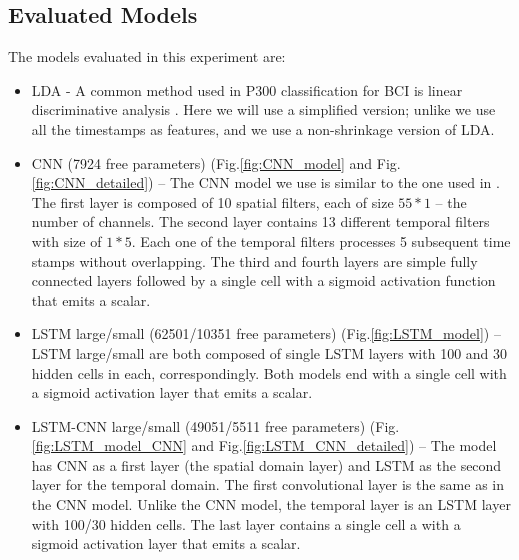 \documentclass[
12pt, %
english, %
doublespacing, %
headsepline, %
]{MastersDoctoralThesis} %
\begin{document}
\subsection{Evaluated Models}
The models evaluated in this experiment are:
\begin{itemize}
	\item LDA - A common method used in P300 classification for BCI is linear discriminative analysis \cite{BlaknertzExperiment,P300_Tutorial}. Here we will use a simplified version; unlike \cite{BlaknertzExperiment} we use all the timestamps as features, and we use a non-shrinkage version of LDA.
	
	\item CNN (7924 free parameters) (Fig.\ref{fig:CNN_model} and Fig.\ref{fig:CNN_detailed}) -- The CNN model we use is similar to the one used in \cite{P300_CNN}. The first layer is composed of 10  spatial filters, each of size $55*1$ -- the number of channels. The second layer contains 13 different temporal filters with size of $1*5$. Each one of the temporal filters processes 5 subsequent time stamps without overlapping. The third and fourth layers are simple fully connected layers followed by a single cell with a sigmoid activation function that emits a scalar.
	
	\item LSTM large/small (62501/10351 free parameters) (Fig.\ref{fig:LSTM_model}) -- LSTM large/small are both composed of single LSTM layers with 100 and 30 hidden cells in each, correspondingly. Both models end with a single cell with a sigmoid activation layer that emits a scalar.
	
	\item LSTM-CNN large/small (49051/5511 free parameters) (Fig.\ref{fig:LSTM_model_CNN} and Fig.\ref{fig:LSTM_CNN_detailed}) -- The model has CNN as a first layer (the spatial domain layer) and LSTM as the second layer for the temporal domain. The first convolutional layer is the same as in the CNN model. Unlike the CNN model, the temporal layer is an LSTM layer with 100/30 hidden cells. The last layer contains a single cell a with a sigmoid activation layer that emits a scalar.

\end{itemize}
\end{document}
